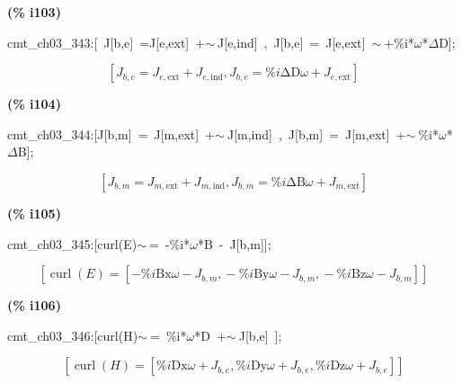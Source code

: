 \documentclass[fleqn]{article}
\begin{document}
\noindent
\begin{minipage}[t]{4.000000em}\color{red}\bfseries
(\% i103)	
\end{minipage}
\begin{minipage}[t]{\textwidth}\color{blue}
cmt\_ch03\_343:[\ J[b,e]\ =J[e,ext]\ +\ensuremath{\sim\ }J[e,ind]\ ,\ J[b,e]\ =\ J[e,ext]\ \ensuremath{\sim\ }+\%i*\ensuremath{\omega}*\ensuremath{\Delta}D];
\end{minipage}
\[\displaystyle \tag{cmt\_ ch03\_ 343} 
\left[ {J_{b,e}}={J_{e,\ensuremath{\mathrm{ext}}}}+{J_{e,\ensuremath{\mathrm{ind}}}}\operatorname{,}{J_{b,e}}=\% i \ensuremath{\mathrm{\Delta D}} \omega +{J_{e,\ensuremath{\mathrm{ext}}}}\right] \mbox{}
\]


\noindent
\begin{minipage}[t]{4.000000em}\color{red}\bfseries
(\% i104)	
\end{minipage}
\begin{minipage}[t]{\textwidth}\color{blue}
cmt\_ch03\_344:[J[b,m]\ =\ J[m,ext]\ +\ensuremath{\sim\ }J[m,ind]\ ,\ J[b,m]\ =\ J[m,ext]\ +\ensuremath{\sim\ }\%i*\ensuremath{\omega}*\ensuremath{\Delta}B];
\end{minipage}
\[\displaystyle \tag{cmt\_ ch03\_ 344} 
\left[ {J_{b,m}}={J_{m,\ensuremath{\mathrm{ext}}}}+{J_{m,\ensuremath{\mathrm{ind}}}}\operatorname{,}{J_{b,m}}=\% i \ensuremath{\mathrm{\Delta B}} \omega +{J_{m,\ensuremath{\mathrm{ext}}}}\right] \mbox{}
\]


\noindent
\begin{minipage}[t]{4.000000em}\color{red}\bfseries
(\% i105)	
\end{minipage}
\begin{minipage}[t]{\textwidth}\color{blue}
cmt\_ch03\_345:[curl(E)\ensuremath{\sim\ }=\ -\%i*\ensuremath{\omega}*B\ -\ J[b,m]];
\end{minipage}
\[\displaystyle \tag{cmt\_ ch03\_ 345} 
\left[ \operatorname{curl}(E)=\left[ -\% i \ensuremath{\mathrm{Bx}} \omega -{J_{b,m}}\operatorname{,}-\% i \ensuremath{\mathrm{By}} \omega -{J_{b,m}}\operatorname{,}-\% i \ensuremath{\mathrm{Bz}} \omega -{J_{b,m}}\right] \right] \mbox{}
\]


\noindent
\begin{minipage}[t]{4.000000em}\color{red}\bfseries
(\% i106)	
\end{minipage}
\begin{minipage}[t]{\textwidth}\color{blue}
cmt\_ch03\_346:[curl(H)\ensuremath{\sim\ }=\ \%i*\ensuremath{\omega}*D\ +\ensuremath{\sim\ }J[b,e]\ ];
\end{minipage}
\[\displaystyle \tag{cmt\_ ch03\_ 346} 
\left[ \operatorname{curl}(H)=\left[ \% i \ensuremath{\mathrm{Dx}} \omega +{J_{b,e}}\operatorname{,}\% i \ensuremath{\mathrm{Dy}} \omega +{J_{b,e}}\operatorname{,}\% i \ensuremath{\mathrm{Dz}} \omega +{J_{b,e}}\right] \right] \mbox{}
\]
\end{document}
